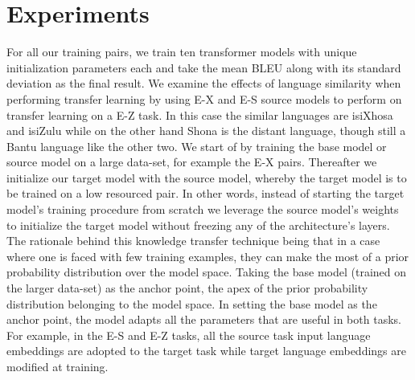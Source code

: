 \documentclass[11pt,a4paper]{article}
\begin{document}
\section{Experiments}\label{sec: experiments}
\indent For all our training pairs, we train ten transformer models with unique initialization parameters each and take the mean BLEU along with its standard deviation as the final result. We examine the effects of language similarity when performing transfer learning by using E-X and E-S source models to perform on transfer learning on a E-Z task. In this case the similar languages are isiXhosa and isiZulu while on the other hand Shona is the distant language, though still a Bantu language like the other two. We start of by training the base model or source model on a large data-set, for example the E-X pairs. Thereafter we initialize our target model with the source model, whereby the target model is to be trained on a low resourced pair. In other words, instead of starting the target model's training procedure from scratch we leverage the source model's weights to initialize the target model without freezing any of the architecture's layers. \\ \indent The rationale behind this knowledge transfer technique being that in a case where one is faced with few training examples, they can make the most of a prior probability distribution over the model space. Taking the base model (trained on the larger data-set) as the anchor point, the apex of the prior probability distribution belonging to the model space. In setting the base model as the anchor point, the model adapts all the parameters that are useful in both tasks. For example, in the E-S and E-Z tasks, all the source task input language embeddings are adopted to the target task while target language embeddings are modified at training.
\end{document}
